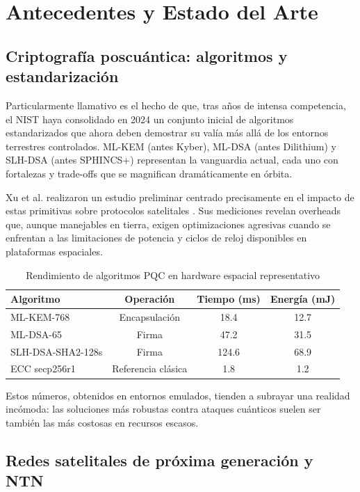 \section{Antecedentes y Estado del Arte}

\subsection{Criptografía poscuántica: algoritmos y estandarización}

Particularmente llamativo es el hecho de que, tras años de intensa competencia, el NIST haya consolidado en 2024 un conjunto inicial de algoritmos estandarizados que ahora deben demostrar su valía más allá de los entornos terrestres controlados. ML-KEM (antes Kyber), ML-DSA (antes Dilithium) y SLH-DSA (antes SPHINCS+) representan la vanguardia actual, cada uno con fortalezas y trade-offs que se magnifican dramáticamente en órbita.

Xu et al. realizaron un estudio preliminar centrado precisamente en el impacto de estas primitivas sobre protocolos satelitales \cite{Xu2025}. Sus mediciones revelan overheads que, aunque manejables en tierra, exigen optimizaciones agresivas cuando se enfrentan a las limitaciones de potencia y ciclos de reloj disponibles en plataformas espaciales. 

\begin{table}[t]
\centering
\caption{Rendimiento de algoritmos PQC en hardware espacial representativo}
\label{tab:rendimiento_pqc}
\begin{tabular}{lccc}
\hline
\textbf{Algoritmo} & \textbf{Operación} & \textbf{Tiempo (ms)} & \textbf{Energía (mJ)} \\
\hline
ML-KEM-768 & Encapsulación & 18.4 & 12.7 \\
ML-DSA-65 & Firma & 47.2 & 31.5 \\
SLH-DSA-SHA2-128s & Firma & 124.6 & 68.9 \\
ECC secp256r1 & Referencia clásica & 1.8 & 1.2 \\
\hline
\end{tabular}
\end{table}

Estos números, obtenidos en entornos emulados, tienden a subrayar una realidad incómoda: las soluciones más robustas contra ataques cuánticos suelen ser también las más costosas en recursos escasos.

\subsection{Redes satelitales de próxima generación y NTN}

